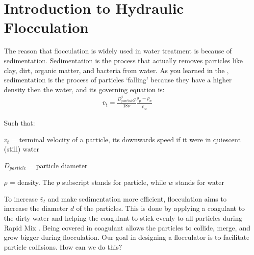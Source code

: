 \documentclass[letterpaper,10pt,english]{sphinxmanual}
\begin{document}
\section{Introduction to Hydraulic Flocculation}
\label{\detokenize{Flocculation/Floc_Design:introduction-to-hydraulic-flocculation}}
The reason that flocculation is widely used in water treatment is because of sedimentation. Sedimentation is the process that actually removes particles like clay, dirt, organic matter, and bacteria from water. As you learned in the
{\hyperref[\detokenize{Introduction/Introduction:heading-treatment-trains}]{}}, sedimentation is the process of particles ‘falling’ because they have a higher density then the water, and its governing equation is:
\begin{equation}\label{equation:Flocculation/Floc_Design:Flocculation/Floc_Design:0}
\begin{split}\bar v_t = \frac{D_{particle}^2 g}{18 \nu} \frac{\rho_p - \rho_w}{\rho_w}\end{split}
\end{equation}
\begin{DUlineblock}{0em}
\item[] Such that:
\item[] \(\bar v_t\) = terminal velocity of a particle, its downwards speed if it were in quiescent (still) water
\item[] \(D_{particle}\) = particle diameter
\item[] \(\rho\) = density. The \(p\) subscript stands for particle, while \(w\) stands for water
\end{DUlineblock}

To increase \(\bar v_t\) and make sedimentation more efficient, flocculation aims to increase the diameter \(d\) of the particles. This is done by applying a coagulant to the dirty water and helping the coagulant to stick evenly to all particles during Rapid Mix . Being covered in coagulant allows the particles to collide, merge, and grow bigger during flocculation.
Our goal in designing a flocculator is to facilitate particle collisions. How can we do this?
\end{document}
